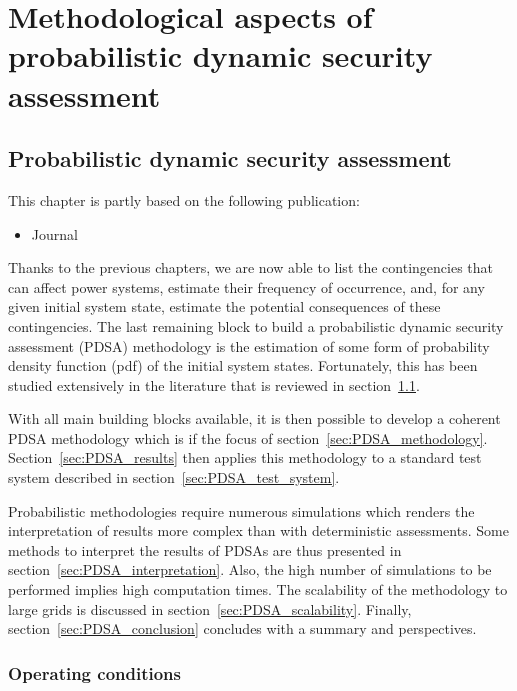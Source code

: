 \part{Methodological aspects of probabilistic dynamic security assessment}
\label{part:PDSA}
\chapter{Probabilistic dynamic security assessment}
\label{ch:DPSA}
\minitoc

\begin{tcolorbox}[width=\linewidth, sharp corners=all,
    colback=white!80!black,
    colframe=white!80!black]
This chapter is partly based on the following publication:
\begin{itemize}
    \item Journal
\end{itemize}
\end{tcolorbox}

Thanks to the previous chapters, we are now able to list the contingencies that can affect power systems, estimate their frequency of occurrence, and, for any given initial system state, estimate the potential consequences of these contingencies. The last remaining block to build a probabilistic dynamic security assessment (PDSA) methodology is the estimation of some form of probability density function (pdf) of the initial system states. Fortunately, this has been studied extensively in the literature that is reviewed in section~\ref{sec:operating_conditions}.

With all main building blocks available, it is then possible to develop a coherent PDSA methodology which is if the focus of section~\ref{sec:PDSA_methodology}. Section~\ref{sec:PDSA_results} then applies this methodology to a standard test system described in section~\ref{sec:PDSA_test_system}.

Probabilistic methodologies require numerous simulations which renders the interpretation of results more complex than with deterministic assessments. Some methods to interpret the results of PDSAs are thus presented in section~\ref{sec:PDSA_interpretation}. Also, the high number of simulations to be performed implies high computation times. The scalability of the methodology to large grids is discussed in section~\ref{sec:PDSA_scalability}. Finally, section~\ref{sec:PDSA_conclusion} concludes with a summary and perspectives.



\section{Operating conditions}
\label{sec:operating_conditions}

